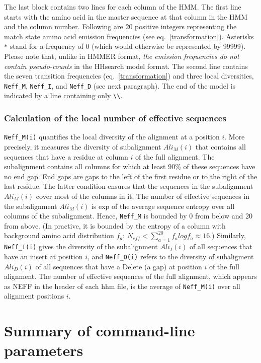 \documentclass[11pt,a4paper]{article}
\begin{document}
The last block contains two lines for each column of the HMM. The first line starts with the amino acid in the master sequence at that column in the HMM and the column number. Following are 20  positive integers representing the match state amino acid emission frequencies (see eq.\ \ref{transformation}). Asterisks \verb`*` stand for a frequency of 0 (which would otherwise be represented by 99999). Please note that, unlike in HMMER format,  \emph{the emission frequencies do not contain pseudo-counts} in the HHsearch model format. The second line contains the seven transition frequencies (eq.\ \ref{transformation}) and three local diversities, \verb`Neff_M`, \verb`Neff_I`, and \verb`Neff_D` (see next paragraph). The end of the model is indicated by a line containing only \verb`\\`.

\subsubsection*{Calculation of the local number of effective sequences}

\verb`Neff_M(i)` quantifies the local diversity of the alignment at a position $i$. More precisely, it measures the diversity of subalignment $Ali_M(i)$ that contains all sequences that have a residue at column $i$ of the full alignment. The subalignment contains all columns for which at least 90\% of these sequences have no end gap. End gaps are gaps to the left of the first residue or to the right of the last residue. The latter condition ensures that the sequences in the subalignment $Ali_M(i)$ cover most of the columns in it. The number of effective sequences in the subalignment $Ali_M(i)$ is exp of the average sequence entropy over all columns of the subalignment. Hence, \verb`Neff_M` is bounded by 0 from below and 20 from above. (In practive, it is bounded by the entropy of a column with background amino acid distribution $f_a$: $N_{eff} < \sum_{a=1}^{20} f_a log f_a \approx 16$.) Similarly, \verb`Neff_I(i)` gives the diversity of the subalignment $Ali_I(i)$ of all sequences that have an insert at position $i$, and \verb`Neff_D(i)` refers to the diversity of subaligment $Ali_D(i)$ of all sequences that have a Delete (a gap) at position $i$ of the full alignment. The number of effective sequences of the full alignment, which appears as NEFF in the header of each hhm file, is the average of \verb`Neff_M(i)` over all alignment positions $i$.


\section{Summary of command-line parameters}
\end{document}
